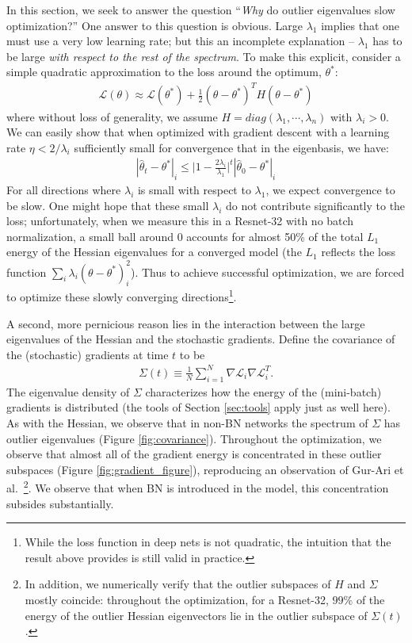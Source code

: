 \documentclass{article}
\newcommand{\loss}{\mathcal{L}}
\begin{document}
In this section, we seek to answer the question ``\emph{Why} do outlier eigenvalues slow optimization?'' One answer to this question is obvious. Large $\lambda_1$ implies that one must use a very low learning rate; but this an incomplete explanation -- $\lambda_1$ has to be large \emph{with respect to the rest of the spectrum}. To make this explicit, consider a simple quadratic approximation to the loss around the optimum, $\theta^*$:
\begin{align}
\loss(\theta) \approx \loss(\theta^*) + \frac{1}{2} (\theta - \theta^*)^TH(\theta - \theta^*)
\end{align}
where without loss of generality, we assume $ H = diag(\lambda_1, \cdots, \lambda_n)$ with $\lambda_i >0$. We can easily show that when optimized with gradient descent with a learning rate $\eta < 2 / \lambda_i$ sufficiently small for convergence that in the eigenbasis, we have:
\begin{align}\label{eqn:quadratic_convergence}
|\hat{\theta}_t - \theta^*|_i \leq \bigg\vert 1 - \frac{2\lambda_i}{\lambda_1} \bigg\vert^t |\hat{\theta}_0 - \theta^*|_i
\end{align}
For all directions where $\lambda_i$ is small with respect to $\lambda_1$, we expect convergence to be slow. One might hope that these small $\lambda_i$ do not contribute significantly to the loss; unfortunately, when we measure this in a Resnet-32 with no batch normalization, a small ball around 0 accounts for almost 50\% of the total $L_1$ energy of the Hessian eigenvalues for a converged model (the $L_1$ reflects the loss function $\sum_i \lambda_i (\theta - \theta^{\ast})_i^2$). Thus to achieve successful optimization, we are forced to optimize these slowly converging directions\footnote{While the loss function in deep nets is not quadratic, the intuition that the result above provides is still valid in practice.}.

A second, more pernicious reason lies in the interaction between the large eigenvalues of the Hessian and the stochastic gradients. Define the covariance of the (stochastic) gradients at time $t$ to be 
\begin{align}
\Sigma(t) \equiv \frac{1}{N} \sum_{i = 1}^N \nabla \loss_i \nabla \loss_i^T.
\end{align}
The eigenvalue density of $\Sigma$ characterizes how the energy of the (mini-batch) gradients is distributed (the tools of Section \ref{sec:tools} apply just as well here). As with the Hessian, we observe that in non-BN networks the spectrum of $\Sigma$ has outlier eigenvalues (Figure \ref{fig:covariance}). Throughout the optimization, we observe that almost all of the gradient energy is concentrated in these outlier subspaces (Figure \ref{fig:gradient_figure}), reproducing an observation of Gur-Ari et al.\ \cite{gur2018gradient}\footnote{In addition, we numerically verify that the outlier subspaces of $H$ and $\Sigma$ mostly coincide: throughout the optimization, for a Resnet-32, $99\%$ of the energy of the outlier Hessian eigenvectors lie in the outlier subspace of $\Sigma(t)$.}. We observe that when BN is introduced in the model, this concentration subsides substantially. 
\end{document}
